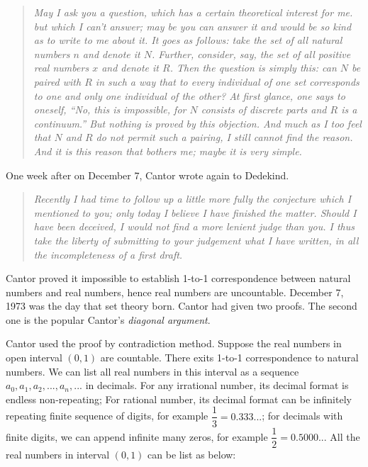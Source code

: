 \documentclass{article}
\begin{document}
\begin{quotation}
\itshape
May I ask you a question, which has a certain theoretical interest for me. but which I can't answer; may be you can answer it and would be so kind as to write to me about it. It goes as follows: take the set of all natural numbers $n$ and denote it $N$. Further, consider, say, the set of all positive real numbers $x$ and denote it $R$. Then the question is simply this: can $N$ be paired with $R$ in such a way that to every individual of one set corresponds to one and only one individual of the other? At first glance, one says to oneself, ``No, this is impossible, for $N$ consists of discrete parts and $R$ is a continuum.'' But nothing is proved by this objection. And much as I too feel that $N$ and $R$ do not permit such a pairing, I still cannot find the reason. And it is this reason that bothers me; maybe it is very simple.
\end{quotation}


One week after on December 7, Cantor wrote again to Dedekind.

\begin{quotation}
\itshape
Recently I had time to follow up a little more fully the conjecture which I mentioned to you; only today I believe I have finished the matter. Should I have been deceived, I would not find a more lenient judge than you. I thus take the liberty of submitting to your judgement what I have written, in all the incompleteness of a first draft.
\end{quotation}

Cantor proved it impossible to establish 1-to-1 correspondence between natural numbers and real numbers, hence real numbers are uncountable. December 7, 1973 was the day that set theory born. Cantor had given two proofs. The second one is the popular Cantor's {\em diagonal argument}.

Cantor used the proof by contradiction method. Suppose the real numbers in open interval $(0, 1)$ are countable. There exits 1-to-1 correspondence to natural numbers. We can list all real numbers in this interval as a sequence $a_0, a_1, a_2, ..., a_n, ...$ in decimals. For any irrational number, its decimal format is endless non-repeating; For rational number, its decimal format can be infinitely repeating finite sequence of digits, for example $\dfrac{1}{3} = 0.333...$; for decimals with finite digits, we can append infinite many zeros, for example $\dfrac{1}{2} = 0.5000...$ All the real numbers in interval $(0, 1)$ can be list as below:
\end{document}
